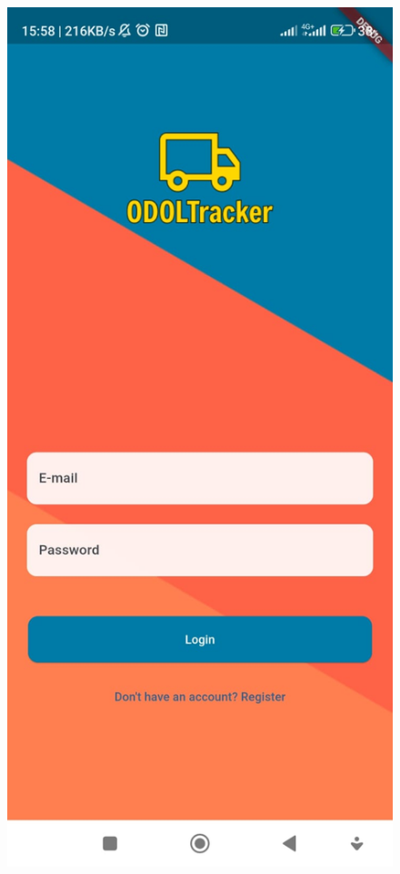 \begin{figure}[htbp]
  \centering

  \includegraphics[scale=0.2]{gambar/bab3-login.jpeg}

\end{figure}
